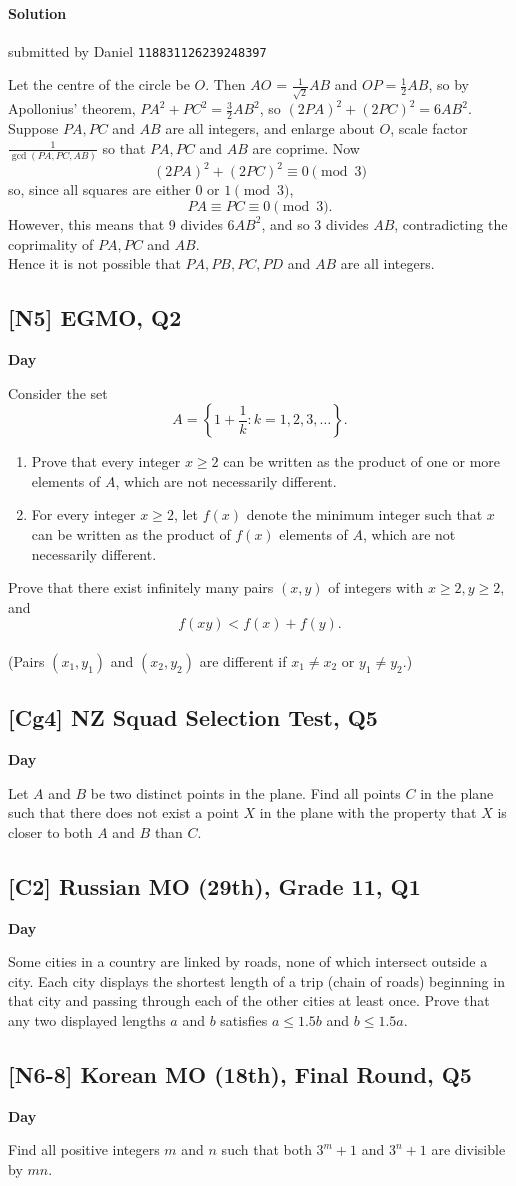 \documentclass[10pt]{article}
\newcommand{\themonth}{March}
\newcommand{\theyear}{2019}
\newcounter{day}
\newcounter{solution}
\newcounter{datenumber}
\newcommand{\problem}[4][0]{
	\newpage
	\subsection{[#3] \space #2} \hfill 
	{\large\textbf{Day \arabic{day}}} %
	\begin{flushleft} #4 \end{flushleft}
	\vspace{1em}
	\addtocounter{day}{1}
	\addtocounter{datenumber}{1}
	\setcounter{solution}{1}
}
\newcommand{\solution}[4][0]{
	\paragraph{Solution \arabic{solution}} \hfill submitted by #2 \hfill \texttt{#3}
	\begin{flushleft} #4 \end{flushleft}
	\addtocounter{solution}{1}
	\vspace{1em}
}
\begin{document}
\solution[12]{Daniel}{118831126239248397}{Let the centre of the circle be \(O\). Then \(AO\) = \(\frac{1}{\sqrt{2}}AB\) and \(OP = \frac{1}{2} AB\), so by Apollonius' theorem, \(PA^2 + PC^2 =  \frac{3}{2} AB^2\), so \(\left(2PA\right)^2 + \left(2PC\right)^2 = 6AB^2\). Suppose \(PA, PC\) and \(AB\) are all integers, and enlarge about \(O\), scale factor \(\frac{1}{\gcd\left(PA,PC,AB\right)}\) so that \(PA, PC\) and \(AB\) are coprime. Now
	\[\left(2PA\right)^2 + \left(2PC\right)^2 \equiv 0 \pmod 3\]
	so, since all squares are either \(0\) or \(1 \pmod 3\),
	\[PA \equiv PC \equiv 0 \pmod 3.\]
	However, this means that 9 divides \(6AB^2\), and so 3 divides \(AB\), contradicting the coprimality of \(PA, PC\) and \(AB\).\\
	
	Hence it is not possible that \(PA, PB, PC, PD\) and \(AB\) are all integers.}

\problem[13]{2018 EGMO, Q2}{N5}{Consider the set \[A = \left\{1 + \frac 1k : k = 1, 2, 3, \dots \right\}.\]	\begin{enumerate} \item Prove that every integer $x \geq 2$ can be written as the product of one or more elements of $A$, which are not necessarily different. \item For every integer $x \geq 2$, let $f(x)$ denote the minimum integer such that $x$ can be written as the product of $f(x)$ elements of $A$, which are not necessarily different. \end{enumerate} \noindent Prove that there exist infinitely many pairs $(x, y)$ of integers with $x \geq 2, y \geq 2$, and \[f(xy) < f(x) + f(y).\] \\ (Pairs $(x_1, y_1)$ and $(x_2, y_2)$ are different if $x_1 \neq x_2$ or $y_1 \neq y_2$.)}

\problem[14]{2017 NZ Squad Selection Test, Q5}{Cg4}{Let $A$ and $B$ be two distinct points in the plane. Find all points $C$ in the plane such that there does not exist a point $X$ in the plane with the property that $X$ is closer to both $A$ and $B$ than $C$.}

\problem[15]{2009 Russian MO (29th), Grade 11, Q1}{C2}{Some cities in a country are linked by roads, none of which intersect outside a city. Each city displays the shortest length of a trip (chain of roads) beginning in that city and passing through each of the other cities at least once. Prove that any two displayed lengths $a$ and $b$ satisfies $a \leq 1.5b$ and $b \leq 1.5a.$}

\problem[16]{2005 Korean MO (18th), Final Round, Q5}{N6-8}{Find all positive integers $m$ and $n$ such that both $3^m +1$ and $3^n +1$ are divisible by $mn$.}
\end{document}
